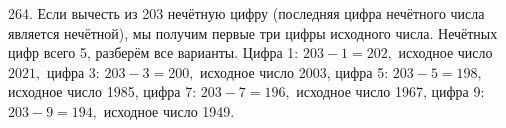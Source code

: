 264. Если вычесть из 203 нечётную цифру (последняя цифра нечётного числа является нечётной), мы получим первые три цифры исходного числа. Нечётных цифр всего 5, разберём все варианты. Цифра 1: $203-1=202,$ исходное число $2021,$ цифра 3: $203-3=200,$ исходное число 2003, цифра 5: $203-5=198,$ исходное число 1985, цифра 7: $203-7=196,$ исходное число 1967, цифра 9: $203-9=194,$ исходное число 1949.\\
